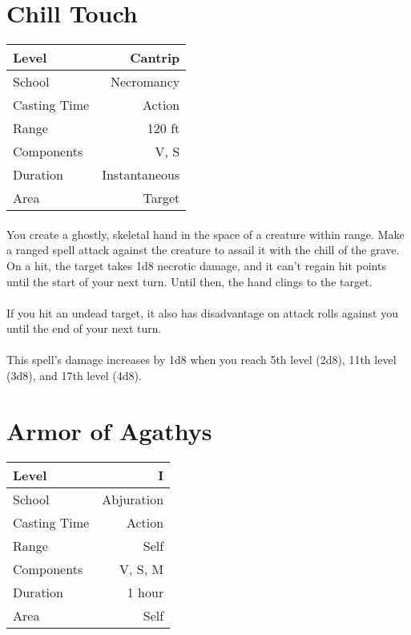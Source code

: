 \documentclass[a5paper,12pt]{article}
\begin{document}
\section*{Chill Touch}
\begin{table}[h]
   \centering
   \begin{tabular}{|l|r|}
      \hline
      Level        & Cantrip \\
      \hline
      School       & Necromancy \\
      \hline
      Casting Time & Action \\
      \hline
      Range        & 120 ft \\
      \hline
      Components   & V, S \\
      \hline
      Duration     & Instantaneous \\
      \hline
      Area         & Target \\
      \hline
   \end{tabular}
\end{table}

\paragraph{}
You create a ghostly, skeletal hand in the space of a creature within range. Make a ranged spell attack against the creature to assail it with the chill of the grave. On a hit, the target takes 1d8 necrotic damage, and it can't regain hit points until the start of your next turn. Until then, the hand clings to the target.

\paragraph{}
If you hit an undead target, it also has disadvantage on attack rolls against you until the end of your next turn.

\paragraph{}
This spell's damage increases by 1d8 when you reach 5th level (2d8), 11th level (3d8), and 17th level (4d8).

\newpage

\section*{Armor of Agathys}
\begin{table}[h]
   \centering
   \begin{tabular}{|l|r|}
      \hline
      Level        & I \\
      \hline
      School       & Abjuration \\
      \hline
      Casting Time & Action \\
      \hline
      Range        & Self \\
      \hline
      Components   & V, S, M \\
      \hline
      Duration     & 1 hour \\
      \hline
      Area         & Self \\
      \hline
   \end{tabular}
\end{table}
\end{document}
